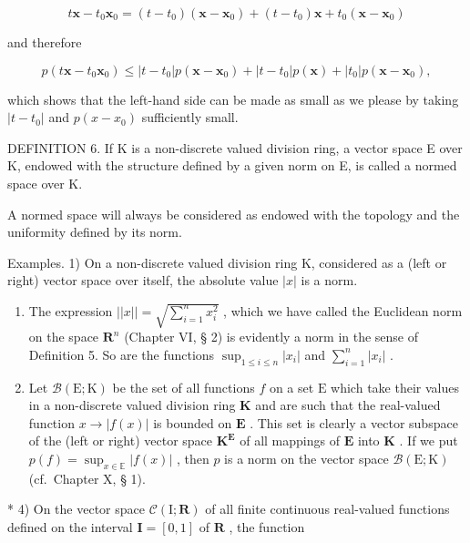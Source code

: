 \[
t \boldsymbol {x} - t _ {0} \boldsymbol {x} _ {0} = (t - t _ {0}) (\boldsymbol {x} - \boldsymbol {x} _ {0}) + (t - t _ {0}) \boldsymbol {x} + t _ {0} (\boldsymbol {x} - \boldsymbol {x} _ {0})
\]

and therefore

\[
p (t \boldsymbol {x} - t _ {0} \boldsymbol {x} _ {0}) \leqslant | t - t _ {0} | p (\boldsymbol {x} - \boldsymbol {x} _ {0}) + | t - t _ {0} | p (\boldsymbol {x}) + | t _ {0} | p (\boldsymbol {x} - \boldsymbol {x} _ {0}),
\]

which shows that the left-hand side can be made as small as we please by taking \(|t - t_{0}|\) and \(p(x - x_{0})\) sufficiently small.

DEFINITION 6. If K is a non-discrete valued division ring, a vector space E over K, endowed with the structure defined by a given norm on E, is called a normed space over K.

A normed space will always be considered as endowed with the topology and the uniformity defined by its norm.

Examples. 1) On a non-discrete valued division ring K, considered as a (left or right) vector space over itself, the absolute value \(|x|\) is a norm.

\begin{enumerate}
\def\labelenumi{\arabic{enumi})}
\setcounter{enumi}{1}
\item
  The expression \(||x|| = \sqrt{\sum_{i=1}^{n} x_i^2}\) , which we have called the Euclidean norm on the space \(\mathbf{R}^n\) (Chapter VI, § 2) is evidently a norm in the sense of Definition 5. So are the functions \(\sup_{1 \leqslant i \leqslant n} |x_i|\) and \(\sum_{i=1}^{n} |x_i|\) .
\item
  Let \(\mathcal{B}(\mathrm{E};\mathrm{K})\) be the set of all functions \(f\) on a set \(\mathrm{E}\) which take their values in a non-discrete valued division ring \(\mathbf{K}\) and are such that the real-valued function \(x\to |f(x)|\) is bounded on \(\mathbf{E}\) . This set is clearly a vector subspace of the (left or right) vector space \(\mathbf{K}^{\mathbf{E}}\) of all mappings of \(\mathbf{E}\) into \(\mathbf{K}\) . If we put \(p(f)=\sup_{x\in\mathbb{E}}|f(x)|\) , then \(p\) is a norm on the vector space \(\mathcal{B}(\mathrm{E};\mathrm{K})\) (cf.~Chapter X, § 1).
\end{enumerate}

* 4) On the vector space \(\mathcal{C}(\mathrm{I};\mathbf{R})\) of all finite continuous real-valued functions defined on the interval \(\mathbf{I} = [0,1]\) of \(\mathbf{R}\) , the function

